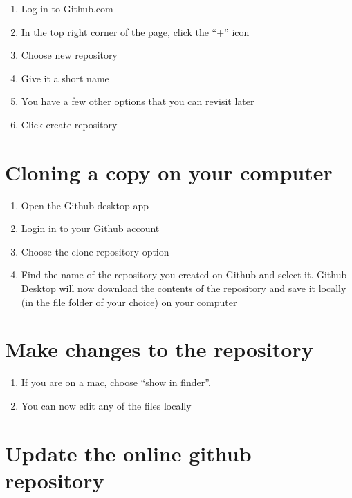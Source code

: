 \documentclass[
]{book}
\providecommand{\tightlist}{%
  \setlength{\itemsep}{0pt}\setlength{\parskip}{0pt}}
\begin{document}
\begin{enumerate}
\def\labelenumi{\arabic{enumi}.}
\tightlist
\item
  Log in to Github.com
\item
  In the top right corner of the page, click the ``+'' icon
\item
  Choose new repository
\item
  Give it a short name
\item
  You have a few other options that you can revisit later
\item
  Click create repository
\end{enumerate}

\hypertarget{cloning-a-copy-on-your-computer}{%
\section{Cloning a copy on your computer}\label{cloning-a-copy-on-your-computer}}

\begin{enumerate}
\def\labelenumi{\arabic{enumi}.}
\tightlist
\item
  Open the Github desktop app
\item
  Login in to your Github account
\item
  Choose the clone repository option
\item
  Find the name of the repository you created on Github and select it. Github Desktop will now download the contents of the repository and save it locally (in the file folder of your choice) on your computer
\end{enumerate}

\hypertarget{make-changes-to-the-repository}{%
\section{Make changes to the repository}\label{make-changes-to-the-repository}}

\begin{enumerate}
\def\labelenumi{\arabic{enumi}.}
\tightlist
\item
  If you are on a mac, choose ``show in finder''.
\item
  You can now edit any of the files locally
\end{enumerate}

\hypertarget{update-the-online-github-repository}{%
\section{Update the online github repository}\label{update-the-online-github-repository}}
\end{document}
